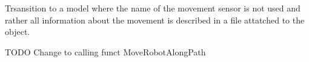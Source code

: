 
\begin{DoxyRefList}
\item[Member \mbox{\hyperlink{class_robot_script_aaaacc0eacd09c68f0e399dfb780c16a3}{Robot\+Script.Get\+Possible\+Movement\+Sensors}} ()]\label{todo__todo000001}%
%
Trsansition to a model where the name of the movement sensor is not used and rather all information about the movement is described in a file attatched to the object. ~\newline
  
\item[Member \mbox{\hyperlink{class_robot_script_ad74bcd3d5bda1662a2e8886403dc3eb2}{Robot\+Script.Move\+To\+Node}} (Game\+Object End\+Node)]\label{todo__todo000002}%
%
TODO Change to calling funct Move\+Robot\+Along\+Path 
\end{DoxyRefList}